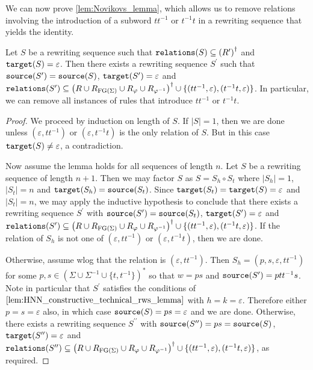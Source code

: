 We can now prove \cref{lem:Novikovs_lemma}, which allows us to remove relations involving the
introduction of a subword $tt^{-1}$ or $t^{-1}t$ in a rewriting sequence that yields the identity.

\begin{lemma}%
  \label{lem:Novikovs_lemma}
  Let $S$ be a rewriting sequence such that $\texttt{relations}(S)\subseteq {(R^\prime)}^\dagger$ and
  $\texttt{target}(S) = \varepsilon$. Then
  there exists
  a rewriting sequence $S^\prime$ such that $\texttt{source}(S^\prime) = \texttt{source}(S)$,
  $\texttt{target}(S^\prime) = \varepsilon$ and
  $\texttt{relations}(S^\prime) \subseteq
    {\left(R\cup R_{\textrm{FG}(\Sigma)} \cup R_\varphi \cup R_{\varphi^{-1}}\right)}^\dagger \cup
    \{(tt^{-1}, \varepsilon), (t^{-1}t, \varepsilon)\}$.
  In particular, we can remove all instances of rules that introduce $tt^{-1}$ or $t^{-1}t$.
\end{lemma}
\begin{proof}
  We proceed by induction on length of $S$. If $|S| = 1$, then we are done unless $(\varepsilon,
  tt^{-1})$ or $(\varepsilon, t^{-1}t)$ is the only relation of $S$.
  But in this case $\texttt{target}(S)\neq\varepsilon$, a contradiction.

  Now assume the lemma holds for all sequences of length $n$. Let $S$ be a rewriting sequence of
  length $n+1$. Then we may factor $S$ as $S = S_h\circ S_t$ where $|S_h| = 1$, $|S_t| = n$ and
  $\texttt{target}(S_h) = \texttt{source}(S_t)$. Since $\texttt{target}(S_t) = \texttt{target}(S) = \varepsilon$ and $|S_t| = n$,
  we may apply the inductive hypothesis to conclude that
  there exists a rewriting sequence $S^\prime$ with
  $\texttt{source}(S^\prime) = \texttt{source}(S_t)$, $\texttt{target}(S^\prime) = \varepsilon$ and
  $\texttt{relations}(S^\prime) \subseteq {\left(R\cup R_{\textrm{FG}(\Sigma)} \cup R_\varphi \cup R_{\varphi^{-1}}\right)}^\dagger
    \cup \{(tt^{-1}, \varepsilon), (t^{-1}t, \varepsilon)\}$.
  If the relation of $S_h$ is not one of $(\varepsilon, tt^{-1})$ or $(\varepsilon, t^{-1}t)$, then we are done.

  Otherwise, assume wlog that the relation is $(\varepsilon, tt^{-1})$.
  Then $S_h = (p, s, \varepsilon, tt^{-1})$ for some $p, s\in {(\Sigma \cup \Sigma^{-1}\cup \{t, t^{-1}\})}^\ast$
  so that $w = ps$ and $\texttt{source}(S^\prime) = ptt^{-1}s$.
  Note in particular that $S^\prime$ satisfies the conditions of
  $\cref{lem:HNN_constructive_technical_rws_lemma}$ with $h = k = \varepsilon$.
  Therefore either $p = s = \varepsilon$ also, in which case
  $\texttt{source}(S) = ps = \varepsilon$ and we are done. Otherwise, there exists a rewriting sequence
  $S^{\prime\prime}$ with $\texttt{source}(S^{\prime\prime}) = ps = \texttt{source}(S)$,
  $\texttt{target}(S^{\prime\prime}) = \varepsilon$ and
  $\texttt{relations}(S^{\prime\prime}) \subseteq
    {\left(R\cup R_{\textrm{FG}(\Sigma)} \cup R_\varphi \cup R_{\varphi^{-1}}\right)}^\dagger \cup
    \{(tt^{-1}, \varepsilon), (t^{-1}t, \varepsilon)\}$, as required.
\end{proof}

